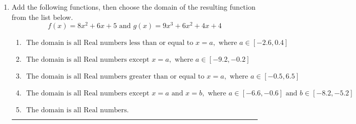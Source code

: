 \documentclass[14pt]{extbook}
\newcommand{\litem}[1]{\item#1\hspace*{-1cm}\rule{\textwidth}{0.4pt}}
\begin{document}
\begin{enumerate}
{\begin{enumerate}[label=\Alph*.]
\end{enumerate} }
\litem{
Add the following functions, then choose the domain of the resulting function from the list below.\[ f(x) = 8x^{2} +6 x + 5 \text{ and } g(x) = 9x^{3} +6 x^{2} +4 x + 4 \]\begin{enumerate}[label=\Alph*.]
\item \( \text{ The domain is all Real numbers less than or equal to } x = a, \text{ where } a \in [-2.6, 0.4] \)
\item \( \text{ The domain is all Real numbers except } x = a, \text{ where } a \in [-9.2, -0.2] \)
\item \( \text{ The domain is all Real numbers greater than or equal to } x = a, \text{ where } a \in [-0.5, 6.5] \)
\item \( \text{ The domain is all Real numbers except } x = a \text{ and } x = b, \text{ where } a \in [-6.6, -0.6] \text{ and } b \in [-8.2, -5.2] \)
\item \( \text{ The domain is all Real numbers. } \)

\end{enumerate} }
\end{enumerate}
\end{document}
